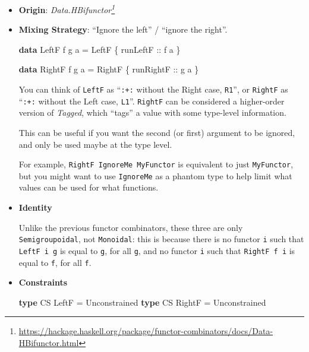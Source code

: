 \documentclass[]{article}
\newenvironment{Shaded}{}{}
\newcommand{\DataTypeTok}[1]{\textcolor[rgb]{0.56,0.13,0.00}{#1}}
\newcommand{\KeywordTok}[1]{\textcolor[rgb]{0.00,0.44,0.13}{\textbf{#1}}}
\newcommand{\NormalTok}[1]{#1}
\newcommand{\OtherTok}[1]{\textcolor[rgb]{0.00,0.44,0.13}{#1}}
\renewcommand{\href}[2]{#2\footnote{\url{#1}}}
\begin{document}
\begin{itemize}
\item
  \textbf{Origin}:
  \emph{\href{https://hackage.haskell.org/package/functor-combinators/docs/Data-HBifunctor.html}{Data.HBifunctor}}
\item
  \textbf{Mixing Strategy}: ``Ignore the left'' / ``ignore the right''.

\begin{Shaded}
\begin{Highlighting}[]
\KeywordTok{data} \DataTypeTok{LeftF}\NormalTok{  f g a }\OtherTok{=} \DataTypeTok{LeftF}\NormalTok{  \{}\OtherTok{ runLeftF  ::}\NormalTok{ f a \}}

\KeywordTok{data} \DataTypeTok{RightF}\NormalTok{ f g a }\OtherTok{=} \DataTypeTok{RightF}\NormalTok{ \{}\OtherTok{ runRightF ::}\NormalTok{ g a \}}
\end{Highlighting}
\end{Shaded}

  You can think of \texttt{LeftF} as ``\texttt{:+:} without the Right case,
  \texttt{R1}'', or \texttt{RightF} as ``\texttt{:+:} without the Left case,
  \texttt{L1}''. \texttt{RightF} can be considered a higher-order version of
  \emph{Tagged}, which ``tags'' a value with some type-level information.

  This can be useful if you want the second (or first) argument to be ignored,
  and only be used maybe at the type level.

  For example, \texttt{RightF\ IgnoreMe\ MyFunctor} is equivalent to just
  \texttt{MyFunctor}, but you might want to use \texttt{IgnoreMe} as a phantom
  type to help limit what values can be used for what functions.
\item
  \textbf{Identity}

  Unlike the previous functor combinators, these three are only
  \texttt{Semigroupoidal}, not \texttt{Monoidal}: this is because there is no
  functor \texttt{i} such that \texttt{LeftF\ i\ g} is equal to \texttt{g}, for
  all \texttt{g}, and no functor \texttt{i} such that \texttt{RightF\ f\ i} is
  equal to \texttt{f}, for all \texttt{f}.
\item
  \textbf{Constraints}

\begin{Shaded}
\begin{Highlighting}[]
\KeywordTok{type} \DataTypeTok{CS} \DataTypeTok{LeftF}  \OtherTok{=} \DataTypeTok{Unconstrained}
\KeywordTok{type} \DataTypeTok{CS} \DataTypeTok{RightF} \OtherTok{=} \DataTypeTok{Unconstrained}
\end{Highlighting}
\end{Shaded}


\end{itemize}
\end{document}
